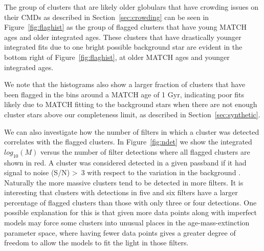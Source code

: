 \documentclass{emulateapj}
\begin{document}
The group of clusters that are likely older globulars that have crowding issues on their CMDs as described in Section~\ref{sec:crowding} can be seen in Figure~\ref{fig:flaghist} as the group of flagged clusters that have young MATCH ages and older integrated ages.  These clusters that have drastically younger integrated fits due to one bright possible background star are evident in the bottom right of Figure~\ref{fig:flaghist}, at older MATCH ages and younger integrated ages. 

We note that the histograms also show a larger fraction of clusters that have been flagged in the bins around a MATCH age of 1 Gyr, indicating poor fits likely due to MATCH fitting to the background stars when there are not enough cluster stars above our completeness limit, as described in Section~\ref{sec:synthetic}.

We can also investigate how the number of filters in which a cluster was detected correlates with the flagged clusters.  In Figure~\ref{fig:ndet} we show the integrated $log_{10} (M)$ versus the number of filter detections where all flagged clusters are shown in red.  A cluster was considered detected in a given passband if it had signal to noise (S/N) \textgreater\ 3 with respect to the variation in the background \citep{Johnson15}.  Naturally the more massive clusters tend to be detected in more filters.  It is interesting that clusters with detections in five and six filters have a larger percentage of flagged clusters than those with only three or four detections.   One possible explanation for this is that given more data points along with imperfect models may force some clusters into unusual places in the age-mass-extinction parameter space, where having fewer data points gives a greater degree of freedom to allow the models to fit the light in those filters.
\end{document}
